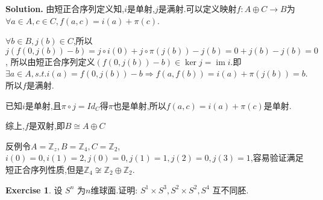 \documentclass[a4paper]{book}
\newenvironment{solution}%
{\noindent\textbf{Solution.}}%
{\qedhere}
\numberwithin{equation}{chapter}
\theoremstyle{definition}
\newtheorem{exc}[exm]{Exercise}
\begin{document}
\begin{solution}
  由短正合序列定义知,$i$是单射,$j$是满射.可以定义映射$f\colon A \oplus C \rightarrow B$为$\forall a\in A, c \in C, f(a,c) = i(a) + \pi(c)$.

  $\forall b \in B, j(b) \in C$,所以$j( f(0,j(b)) - b) = j \circ i(0) + j \circ \pi(j(b)) - j(b) = 0 + j(b) - j(b) = 0$, 所以由短正合序列定义$(f(0,j(b)) - b) \in \ker j = \operatorname{im} i$.即$\exists a \in A, s.t. i(a) = f(0,j(b)) - b \Longrightarrow f(a,f(b)) = i(a) + \pi(j(b)) = b$.所以$f$是满射.
  
  已知$i$是单射,且$\pi\circ j = Id_C$得$\pi$也是单射,所以$f(a,c) = i(a) + \pi(c)$是单射.

  综上,$f$是双射,即$B \cong A \oplus C$

  反例令$A = \mathbb{Z}_z,B = \mathbb{Z}_4, C = \mathbb{Z}_2$,$i(0) = 0, i(1) = 2,j(0) = 0,j(1)= 1,j(2) = 0,j(3) = 1$,容易验证满足短正合序列性质,但是$\mathbb{Z}_4 \not\cong \mathbb{Z}_2 \oplus \mathbb{Z}_2$.
\end{solution}

\begin{exc}
  设 $S^n$ 为$n$维球面.证明: $S^1 \times S^3, S^2 \times  S^2, S^4$ 互不同胚.
\end{exc}
\end{document}
